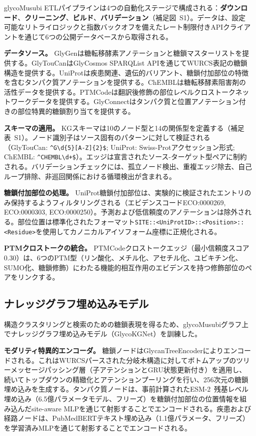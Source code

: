 \documentclass[11pt,a4paper]{ltjsarticle}
\begin{document}
glycoMusubi ETLパイプラインは4つの自動化ステージで構成される：\textbf{ダウンロード}、\textbf{クリーニング}、\textbf{ビルド}、\textbf{バリデーション}（補足図~S1）。データは、設定可能なリトライロジックと指数バックオフを備えたレート制限付きAPIクライアントを通じて6つの公開データベースから取得される。

\textbf{データソース。}
GlyGenは糖転移酵素アノテーションと糖鎖マスターリストを提供する。GlyTouCanはGlyCosmos SPARQList APIを通じてWURCS表記の糖鎖構造を提供する。UniProtは疾患関連、遺伝的バリアント、糖鎖付加部位の特徴を含むタンパク質アノテーションを提供する。ChEMBLは糖転移酵素阻害剤の活性データを提供する。PTMCodeは翻訳後修飾の部位レベルクロストークネットワークデータを提供する。GlyConnectはタンパク質と位置アノテーション付きの部位特異的糖鎖割り当てを提供する。

\textbf{スキーマの適用。}
KGスキーマは10のノード型と14の関係型を定義する（補足表~S1）。ノード識別子はソース固有のパターンに対して検証される（GlyTouCan: \texttt{\^{}G\textbackslash d\{5\}[A-Z]\{2\}\$}; UniProt: Swiss-Protアクセッション形式; ChEMBL: \texttt{\^{}CHEMBL\textbackslash d+\$}）。エッジは宣言されたソース-ターゲット型ペアに制約される。バリデーションチェックには、孤立ノード検出、重複エッジ除去、自己ループ排除、非巡回関係における循環検出が含まれる。

\textbf{糖鎖付加部位の処理。}
UniProt糖鎖付加部位は、実験的に検証されたエントリのみ保持するようフィルタリングされる（エビデンスコードECO:0000269, ECO:0000303, ECO:0000250）。予測および低信頼度のアノテーションは除外される。部位位置は標準化されたフォーマット\texttt{SITE::<UniProtID>::<Position>::<Residue>}を使用してカノニカルアイソフォーム座標に正規化される。

\textbf{PTMクロストークの統合。}
PTMCodeクロストークエッジ（最小信頼度スコア0.30）は、6つのPTM型（リン酸化、メチル化、アセチル化、ユビキチン化、SUMO化、糖鎖修飾）にわたる機能的相互作用のエビデンスを持つ修飾部位のペアをリンクする。

\subsection{ナレッジグラフ埋め込みモデル}

構造クラスタリングと検索のための糖鎖表現を得るため、glycoMusubiグラフ上でナレッジグラフ埋め込みモデル（GlycoKGNet）を訓練した。

\textbf{モダリティ特異的エンコーダ。}
糖鎖ノードはGlycanTreeEncoderによりエンコードされる。これはWURCSパースされた分岐木構造に対してボトムアップのツリーメッセージパッシング層（子アテンションとGRU状態更新付き）を適用し、続いてトップダウンの精緻化とアテンションプーリングを行い、256次元の糖鎖埋め込みを生成する。タンパク質ノードは、事前計算されたESM-2~\cite{lin2023}残基レベル埋め込み（6.5億パラメータモデル、フリーズ）を糖鎖付加部位の位置情報を組み込んだsite-aware MLPを通じて射影することでエンコードされる。疾患および経路ノードは、PubMedBERTテキスト埋め込み（1.1億パラメータ、フリーズ）を学習済みMLPを通じて射影することでエンコードされる。
\end{document}
